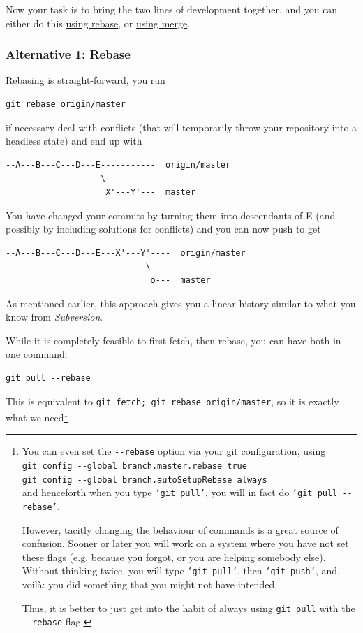\documentclass[12pt,pdftex]{article}
\begin{document}
Now your task is to bring the two lines of development together, and
you can either do this \hyperref[Rebase]{using rebase}, or \hyperref[Merge]{using merge}.


\subsubsection{Alternative 1: Rebase}
\label{sec-5-1-1}

Rebasing is straight-forward, you run
\lstset{frame=single,basicstyle=\ttfamily\footnotesize,language=sh,label= ,caption= ,captionpos=b,numbers=none}
\begin{lstlisting}
git rebase origin/master
\end{lstlisting}
if necessary deal with conflicts (that will temporarily throw your
repository into a headless state) and end up with
\begin{verbatim}
--A---B---C---D---E-----------  origin/master
                   \
                    X'---Y'---  master
\end{verbatim}
You have changed your commits by turning them into descendants of E (and
possibly by including solutions for conflicts) and you can now push to
get
\begin{verbatim}
--A---B---C---D---E---X'---Y'----  origin/master
                            \
                             o---  master
\end{verbatim}
As mentioned earlier, this approach gives you a linear history similar
to what you know from \emph{Subversion}.

\bigskip

While it is completely feasible to first fetch, then rebase, you can
have both in one command:
\lstset{frame=single,basicstyle=\ttfamily\footnotesize,language=sh,label= ,caption= ,captionpos=b,numbers=none}
\begin{lstlisting}
git pull --rebase
\end{lstlisting}
This is equivalent to \verb~git fetch; git rebase origin/master~, so it is
exactly what we need\footnote{You can even set the \texttt{-{}-rebase} option via your git configuration,
using\\
\noindent\qquad\qquad  \texttt{git config -{}-global branch.master.rebase true}\\
\noindent\qquad\qquad  \texttt{git config -{}-global branch.autoSetupRebase always}\\
and henceforth when you type \texttt{‘git pull’}, you will in fact do
\texttt{‘git pull -{}-rebase’}.

However, tacitly changing the behaviour of commands is a great source of
confusion.
Sooner or later you will work on a system where you have not set these
flags (e.g. because you forgot, or you are helping somebody else).
Without thinking twice, you will type \texttt{‘git pull’}, then \texttt{‘git push’},
and, voilà:
you did something that you might not have intended.

Thus, it is better to just get into the habit of always using \texttt{git pull}
with the \texttt{-{}-rebase} flag.}
\end{document}
